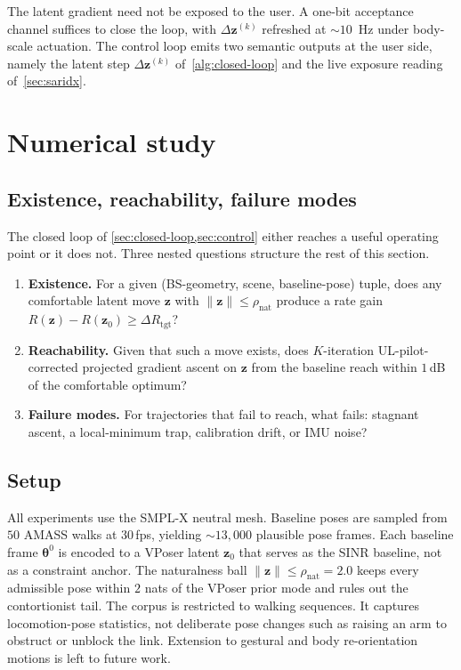\documentclass[journal,twocolumn,10pt]{IEEEtran}
\theoremstyle{plain}
\theoremstyle{definition}
\theoremstyle{remark}
\newcommand{\thetab}{\bm{\theta}}
\begin{document}
The latent gradient need not be exposed to the user. A one-bit
acceptance channel suffices to close the loop, with
$\Delta\bm{z}^{(k)}$ refreshed at $\sim 10$~Hz under body-scale
actuation. The control loop emits two semantic outputs at the user
side, namely the latent step $\Delta\bm{z}^{(k)}$
of~\cref{alg:closed-loop} and the live exposure reading
of~\cref{sec:saridx}.


\section{Numerical study}\label{sec:numerical}

\subsection{Existence, reachability, failure modes}

The closed loop of \cref{sec:closed-loop,sec:control} either reaches
a useful operating point or it does not. Three nested questions
structure the rest of this section.
\begin{enumerate}
\item[\textbf{(E)}] \textbf{Existence.} For a given (BS-geometry,
scene, baseline-pose) tuple, does any comfortable latent move
$\bm{z}$ with $\|\bm{z}\| \leq \rho_\mathrm{nat}$ produce a rate
gain $R(\bm{z}) - R(\bm{z}_0) \geq \Delta R_{\mathrm{tgt}}$?
\item[\textbf{(R)}] \textbf{Reachability.} Given that such a move
exists, does $K$-iteration UL-pilot-corrected projected gradient
ascent on $\bm{z}$ from the baseline reach within $1\,$dB of the
comfortable optimum?
\item[\textbf{(F)}] \textbf{Failure modes.} For trajectories that
fail to reach, what fails: stagnant ascent, a local-minimum trap,
calibration drift, or IMU noise?
\end{enumerate}

\subsection{Setup}

All experiments use the SMPL-X neutral mesh. Baseline poses are
sampled from $50$ AMASS walks at $30\,$fps, yielding
${\sim}13{,}000$ plausible pose frames. Each baseline frame
$\thetab^{0}$ is encoded to a VPoser latent $\bm{z}_0$ that
serves as the SINR baseline, not as a constraint anchor. The
naturalness ball $\|\bm{z}\| \leq \rho_\mathrm{nat} = 2.0$ keeps
every admissible pose within $2$ nats of the VPoser prior mode and
rules out the contortionist tail. The corpus is restricted to
walking sequences. It captures locomotion-pose statistics, not
deliberate pose changes such as raising an arm to obstruct or
unblock the link. Extension to gestural and body re-orientation
motions is left to future work.
\end{document}
